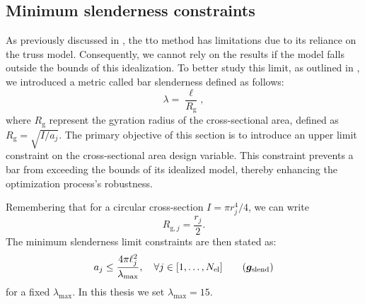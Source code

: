 \subsection{Minimum slenderness constraints}
As previously discussed in , the \gls{tto} method has limitations due to its reliance on the truss model. Consequently, we cannot rely on the results if the model falls outside the bounds of this idealization. To better study this limit, as outlined in , we introduced a metric called bar slenderness defined as follows:
\begin{equation}
    \lambda = \frac{\ell}{R_{\mathrm{g}}},
\end{equation}
where $R_{\mathrm{g}}$ represent the gyration radius of the cross-sectional area, defined as $R_{\mathrm{g}} = \sqrt{I/a_j}$.
The primary objective of this section is to introduce an upper limit constraint on the cross-sectional area design variable. This constraint prevents a bar from exceeding the bounds of its idealized model, thereby enhancing the optimization process's robustness.

Remembering that for a circular cross-section $I = \pi r_j^4/4$, we can write
\begin{equation}
    R_{\mathrm{g},j} = \frac{r_j}{2}.
\end{equation}
The minimum slenderness limit constraints are then stated as:
\begin{equation} \label{eq:04_slend_constraints}
    a_j \leq \frac{4 \pi \ell_j^2}{\lambda_{\text{max}}}, \quad \forall j \in [1,\ldots, N_{\text{el}}]
    \tag{$\vect{g}_{\text{slend}}$}
\end{equation}
for a fixed $\lambda_{\text{max}}$. In this thesis we set $\lambda_{\text{max}}=15$.

